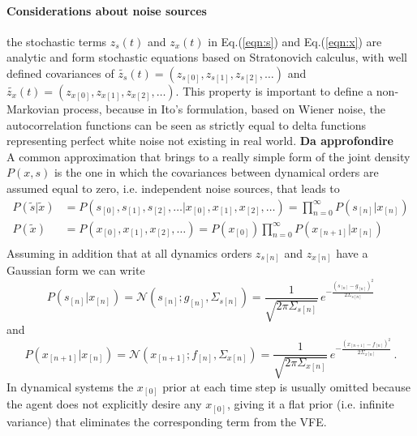 \documentclass[a4paper, 10pt]{article}
\begin{document}
\paragraph{Considerations about noise sources}
the stochastic terms $z_{s}(t)$ and $z_{x}(t)$ in Eq.(\ref{eqn:s}) and Eq.(\ref{eqn:x}) are analytic and form stochastic equations based on Stratonovich calculus, with well defined covariances of $\tilde{z_{s}}(t) = (z_{s[0]}, z_{s[1]}, z_{s[2]}, \dots)$ and $\tilde{z_{x}}(t) = (z_{x[0]}, z_{x[1]}, z_{x[2]}, \dots)$. This property is important to define a non-Markovian process, because in Ito's formulation, based on Wiener noise, the autocorrelation functions can be seen as strictly equal to delta functions representing perfect white noise not existing in real world. \textbf{Da approfondire}\\
A common approximation that brings to a really simple form of the joint density $P(x,s)$ is the one in which the covariances between dynamical orders are assumed equal to zero, i.e. independent noise sources, that leads to 
\begin{equation}
\begin{split}
P(\tilde{s} | \tilde{x}) & = P(s_{[0]}, s_{[1]}, s_{[2]}, \dots | x_{[0]}, x_{[1]}, x_{[2]}, \dots) = \prod_{n=0}^{\infty} P(s_{[n]} | x_{[n]}) \\
P(\tilde{x}) & = P(x_{[0]}, x_{[1]}, x_{[2]}, \dots) = P(x_{[0]}) \prod_{n=0}^{\infty} P(x_{[n+1]} | x_{[n]}) \\
\end{split}
\end{equation}
Assuming in addition that at all dynamics orders $z_{s[n]}$ and $z_{x[n]}$ have a Gaussian form we can write
\begin{equation}
P(s_{[n]} | x_{[n]}) = \mathcal{N}(s_{[n]};g_{[n]},\Sigma_{s[n]})
	=\frac{1}{\sqrt{2\pi \Sigma_{s[n]}}} \, e^{-\frac{(s_{[n]}-g_{[n]})^2}{2 \Sigma_{s[n]}}}
\end{equation}
and
\begin{equation}
P(x_{[n+1]} | x_{[n]}) = \mathcal{N}(x_{[n+1]};f_{[n]},\Sigma_{x[n]})
	=\frac{1}{\sqrt{2\pi \Sigma_{x[n]}}} \, e^{-\frac{(x_{[n+1]}-f_{[n]})^2}{2 \Sigma_{x[n]}}} \, .
\end{equation}
In dynamical systems the $x_{[0]}$ prior at each time step is usually omitted because the agent does not explicitly desire any $x_{[0]}$, giving it a flat prior (i.e. infinite variance) that eliminates the corresponding term from the VFE. 
\end{document}
